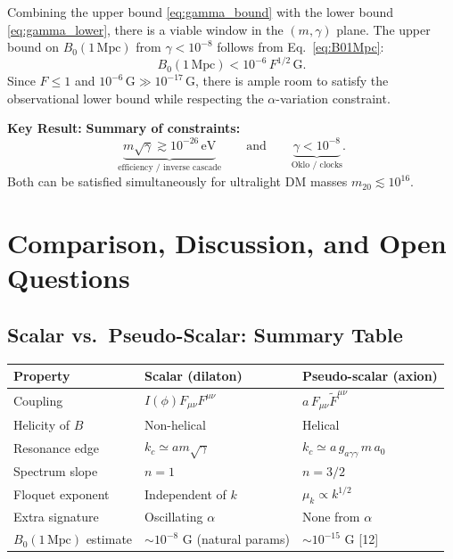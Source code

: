 \documentclass[12pt,a4paper,openany]{book}
\newcommand{\kc}{k_c}
\begin{document}
Combining the upper bound \eqref{eq:gamma_bound} with the lower bound \eqref{eq:gamma_lower}, there is a viable window in the $(m, \gamma)$ plane. The upper bound on $B_0(1\,\mathrm{Mpc})$ from $\gamma < 10^{-8}$ follows from Eq.~\eqref{eq:B01Mpc}:
\begin{equation}
  B_0(1\,\mathrm{Mpc}) < 10^{-6}\,F^{1/2}\,\mathrm{G}.
\end{equation}
Since $F \leq 1$ and $10^{-6}\,\mathrm{G} \gg 10^{-17}\,\mathrm{G}$, there is ample room to satisfy the observational lower bound while respecting the $\alpha$-variation constraint.

\medskip
\noindent\textbf{Key Result:} \textbf{Summary of constraints:}
\[
  \underbrace{m\sqrt{\gamma} \gtrsim 10^{-26}\,\mathrm{eV}}_{\text{efficiency / inverse cascade}}
  \qquad\text{and}\qquad
  \underbrace{\gamma < 10^{-8}}_{\text{Oklo / clocks}}.
\]
Both can be satisfied simultaneously for ultralight DM masses $m_{20} \lesssim 10^{16}$.

\chapter{Comparison, Discussion, and Open Questions}

\section{Scalar vs.\ Pseudo-Scalar: Summary Table}

\begin{center}
\renewcommand{\arraystretch}{1.4}
\begin{tabular}{lll}
\toprule
\textbf{Property} & \textbf{Scalar (dilaton)} & \textbf{Pseudo-scalar (axion)} \\
\midrule
Coupling & $I(\phi)F_{\mu\nu}F^{\mu\nu}$ & $a\,F_{\mu\nu}\tilde{F}^{\mu\nu}$ \\
Helicity of $B$ & Non-helical & Helical \\
Resonance edge & $\kc \simeq am\sqrt{\gamma}$ & $\kc \simeq a\,g_{a\gamma\gamma}\,m\,a_0$ \\
Spectrum slope & $n=1$ & $n=3/2$ \\
Floquet exponent & Independent of $k$ & $\mu_k \propto k^{1/2}$ \\
Extra signature & Oscillating $\alpha$ & None from $\alpha$ \\
$B_0(1\,\mathrm{Mpc})$ estimate & $\sim 10^{-8}$ G (natural params) & $\sim 10^{-15}$ G [12] \\
\bottomrule
\end{tabular}
\end{center}
\end{document}
